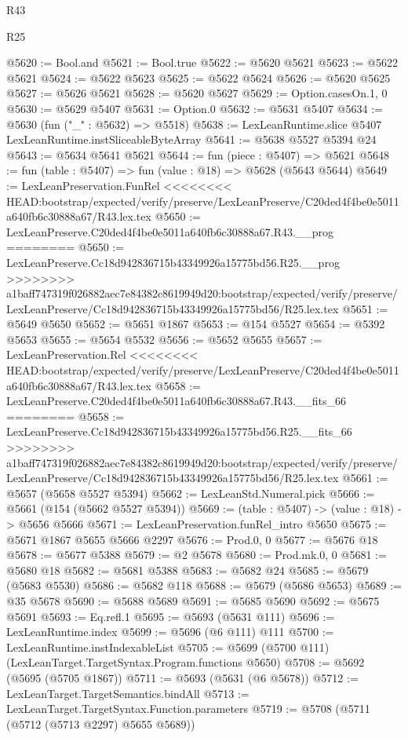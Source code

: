 \begin{lexlean}{R43}
\begin{lexlean}{R25}
\begin{coremodule}
{{{{{{{{{{{{{{{{{{{{{{{{{{{{{{{{{{{{{{{{{{{{{{{{{{{{{{{{{{{{{{{{{{{{{{{{{{{{{{{{{{{{{{{{{{{{{{{{{{{{{{{{{{{{{{{{{{{{{{{{{{{{{{{{{{{{{{{{{{{{{{{{{{{{{{{{{{{{{{{{{{{{{{{{{{{{{{{{{{{{{{{{{{{{{{{{{@5620 := Bool.and
@5621 := Bool.true
@5622 := @5620 @5621
@5623 := @5622 @5621
@5624 := @5622 @5623
@5625 := @5622 @5624
@5626 := @5620 @5625
@5627 := @5626 @5621
@5628 := @5620 @5627
@5629 := Option.casesOn.{1, 0}
@5630 := @5629 @5407
@5631 := Option.{0}
@5632 := @5631 @5407
@5634 := @5630 (fun ("_" : @5632) => @5518)
@5638 := LexLeanRuntime.slice @5407 LexLeanRuntime.instSliceableByteArray
@5641 := @5638 @5527 @5394 @24
@5643 := @5634 @5641 @5621
@5644 := fun (piece : @5407) => @5621
@5648 := fun (table : @5407) => fun (value : @18) => @5628 (@5643 @5644)
@5649 := LexLeanPreservation.FunRel
<<<<<<<< HEAD:bootstrap/expected/verify/preserve/LexLeanPreserve/C20ded4f4be0e5011a640fb6c30888a67/R43.lex.tex
@5650 := LexLeanPreserve.C20ded4f4be0e5011a640fb6c30888a67.R43.__prog
========
@5650 := LexLeanPreserve.Cc18d942836715b43349926a15775bd56.R25.__prog
>>>>>>>> a1baff747319f026882aec7e84382c8619949d20:bootstrap/expected/verify/preserve/LexLeanPreserve/Cc18d942836715b43349926a15775bd56/R25.lex.tex
@5651 := @5649 @5650
@5652 := @5651 @1867
@5653 := @154 @5527
@5654 := @5392 @5653
@5655 := @5654 @5532
@5656 := @5652 @5655
@5657 := LexLeanPreservation.Rel
<<<<<<<< HEAD:bootstrap/expected/verify/preserve/LexLeanPreserve/C20ded4f4be0e5011a640fb6c30888a67/R43.lex.tex
@5658 := LexLeanPreserve.C20ded4f4be0e5011a640fb6c30888a67.R43.__fits_66
========
@5658 := LexLeanPreserve.Cc18d942836715b43349926a15775bd56.R25.__fits_66
>>>>>>>> a1baff747319f026882aec7e84382c8619949d20:bootstrap/expected/verify/preserve/LexLeanPreserve/Cc18d942836715b43349926a15775bd56/R25.lex.tex
@5661 := @5657 (@5658 @5527 @5394)
@5662 := LexLeanStd.Numeral.pick
@5666 := @5661 (@154 (@5662 @5527 @5394))
@5669 := (table : @5407) -> (value : @18) -> @5656 @5666
@5671 := LexLeanPreservation.funRel_intro @5650
@5675 := @5671 @1867 @5655 @5666 @2297
@5676 := Prod.{0, 0}
@5677 := @5676 @18
@5678 := @5677 @5388
@5679 := @2 @5678
@5680 := Prod.mk.{0, 0}
@5681 := @5680 @18
@5682 := @5681 @5388
@5683 := @5682 @24
@5685 := @5679 (@5683 @5530)
@5686 := @5682 @118
@5688 := @5679 (@5686 @5653)
@5689 := @35 @5678
@5690 := @5688 @5689
@5691 := @5685 @5690
@5692 := @5675 @5691
@5693 := Eq.refl.{1}
@5695 := @5693 (@5631 @111)
@5696 := LexLeanRuntime.index
@5699 := @5696 (@6 @111) @111
@5700 := LexLeanRuntime.instIndexableList
@5705 := @5699 (@5700 @111) (LexLeanTarget.TargetSyntax.Program.functions @5650)
@5708 := @5692 (@5695 (@5705 @1867))
@5711 := @5693 (@5631 (@6 @5678))
@5712 := LexLeanTarget.TargetSemantics.bindAll
@5713 := LexLeanTarget.TargetSyntax.Function.parameters
@5719 := @5708 (@5711 (@5712 (@5713 @2297) @5655 @5689))
}}}}}}}}}}}}}}}}}}}}}}}}}}}}}}}}}}}}}}}}}}}}}}}}}}}}}}}}}}}}}}}}}}}}}}}}}}}}}}}}}}}}}}}}}}}}}}}}}}}}}}}}}}}}}}}}}}}}}}}}}}}}}}}}}}}}}}}}}}}}}}}}}}}}}}}}}}}}}}}}}}}}}}}}}}}}}}}}}}}}}}}}}}}}}}}}}
\end{coremodule}
\end{lexlean}
\end{lexlean}
